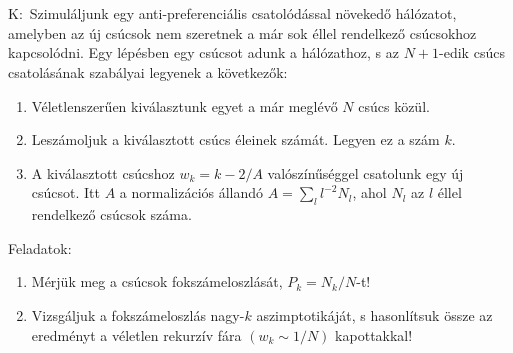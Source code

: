 \section{} \label{sec:2}
K:\ Szimuláljunk egy anti-preferenciális csatolódással növekedő hálózatot, amelyben az új csúcsok nem szeretnek a már sok éllel rendelkező csúcsokhoz kapcsolódni. Egy lépésben egy csúcsot adunk a hálózathoz, s az $N + 1$-edik csúcs csatolásának szabályai legyenek a következők:
\begin{enumerate}
    \item Véletlenszerűen kiválasztunk egyet a már meglévő $N$ csúcs közül.
    \item Leszámoljuk a kiválasztott csúcs éleinek számát. Legyen ez a szám $k$.
    \item A kiválasztott csúcshoz $w_{k} = k -2/A$ valószínűséggel csatolunk egy új csúcsot. Itt $A$ a normalizációs állandó $A = \sum_{l} l^{-2} N_{l}$, ahol $N_{l}$ az $l$ éllel rendelkező csúcsok száma.
\end{enumerate}
Feladatok:

\begin{enumerate}[label=\roman*]
    \item Mérjük meg a csúcsok fokszámeloszlását, $P_{k} = N_{k}/N$-t!
    \item Vizsgáljuk a fokszámeloszlás nagy-$k$ aszimptotikáját, s hasonlítsuk össze az eredményt a véletlen rekurzív fára $(w_{k} \sim 1/N)$ kapottakkal!
\end{enumerate}